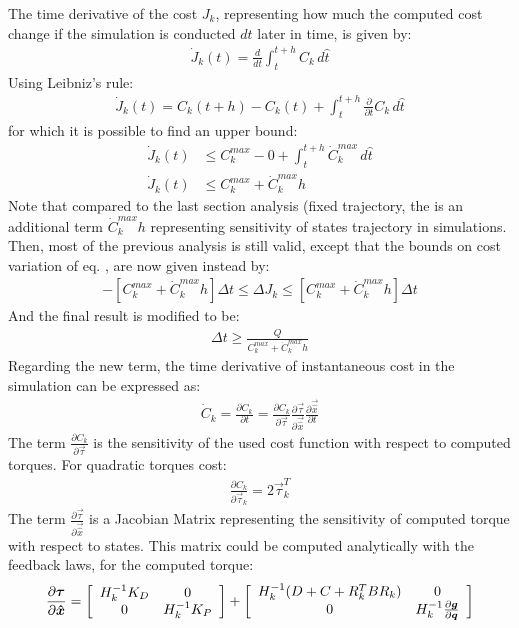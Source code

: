 The time derivative of the cost $J_k$, representing how much the computed cost change if the simulation is conducted $dt$ later in time, is given by:
%
\begin{align}
\dot{J}_k(t) = \frac{d}{dt} \int_{t}^{t+h}{  C_k \, d\hat{t} }
\end{align}
%
Using Leibniz's rule:
%
\begin{align}
\dot{J}_k(t) = C_k( t + h ) -  C_k( t ) +   \int_{t}^{t+h}{ \frac{\partial}{\partial t} C_k \, d\hat{t} }
\end{align}
%
for which it is possible to find an upper bound:
%
\begin{align}
\dot{J}_k(t) &\leq C_k^{max} -  0   +   \int_{t}^{t+h}{ \dot{C}_k^{max} \, d\hat{t} }  \\
\dot{J}_k(t) &\leq C_k^{max}  +   \dot{C}_k^{max} h
\end{align}
%
Note that compared to the last section analysis (fixed trajectory, the is an additional term  $\dot{C}_k^{max} h$ representing sensitivity of states trajectory in simulations. Then, most of the previous analysis is still valid, except that the bounds on cost variation of eq. \label{eq:costvariation}, are now given instead by:
%
\begin{align}
-\left[ C_k^{max}  +   \dot{C}_k^{max} h \right] \Delta t  \leq \Delta J_k \leq \left[ C_k^{max}  +   \dot{C}_k^{max} h \right] \Delta t
\label{eq:costvariationnew}
\end{align}
%
And the final result is modified to be:
%
\begin{align}
\Delta t \geq \frac{Q}{ C_k^{max}  +   \dot{C}_k^{max} h }
\end{align}
%
Regarding the new term, the time derivative of instantaneous cost in the simulation can be expressed as:
%
\begin{align}
\dot{C}_k    = \frac{\partial C_k}{\partial t} = \frac{\partial C_k}{\partial \vec{\tau}} \frac{\partial \vec{\tau}}{\partial \vec{\hat{x}}} \frac{\partial \vec{\hat{x}}}{\partial t} 
\end{align}
%
The term $\frac{\partial C_k}{\partial \vec{\tau}}$ is the sensitivity of the used cost function with respect to computed torques. For quadratic torques cost:
%
\begin{align}
\frac{\partial C_k}{\partial \vec{\tau}_k} = 2\vec{\tau}_k^T
\end{align}
%
The term $\frac{\partial \vec{\tau}}{\partial \vec{\hat{x}}}$ is a Jacobian Matrix representing the sensitivity of computed torque with respect to states. This matrix could be computed analytically with the feedback laws, for the computed torque:
%
\begin{align}
\frac{\partial \vec{\tau}}{\partial \vec{\hat{x}}} = 
\left[ \begin{array}{c c}
	H_k^{-1} K_D & 0 \\ 0 & H_k^{-1} K_P
\end{array} \right] +
\left[ \begin{array}{c c}
	H_k^{-1} ( D + C + R_k^T B R_k ) & 0 \\ 0  & H_k^{-1} \frac{\partial \vec{g}}{\partial \vec{q}}
\end{array} \right] 
\end{align}
%


